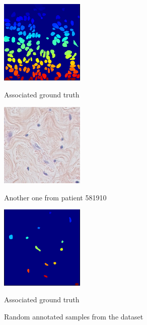 \documentclass{article}
\begin{document}
\begin{figure}[htb]
\begin{minipage}[b]{0.48\linewidth}
  \centerline{\includegraphics[width=4.0cm]{GT_2}}
  \centerline{Associated ground truth}\medskip
\end{minipage}
%
%
\begin{minipage}[b]{.48\linewidth}
  \centering
  \centerline{\includegraphics[width=4.0cm]{RGB_3}}
  \centerline{Another one from patient 581910}\medskip
\end{minipage}
\hfill
\begin{minipage}[b]{0.48\linewidth}
  \centering
  \centerline{\includegraphics[width=4.0cm]{GT_3}}
  \centerline{Associated ground truth}\medskip
\end{minipage}
%
\caption{Random annotated samples from the dataset}
\label{fig:annotation}
%
\end{figure}
\end{document}
